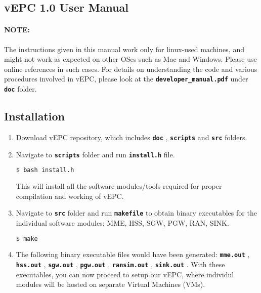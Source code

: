 \documentclass[hidelinks]{report}
\newcommand{\cf}[1] {
	\textbf{\texttt{#1}}
}
\begin{document}

\begin{center}
\section*{vEPC 1.0 User Manual}
\end{center}

\paragraph*{NOTE:}

The instructions given in this manual work only for linux-used machines, and might not work as expected on other OSes such as Mac and Windows. Please use online references in such cases. For details on understanding the code and various procedures involved in vEPC, please look at the \cf{developer\_manual.pdf} under \cf{doc} folder.

\subsection*{Installation}

\begin{enumerate}

\item Download vEPC repository, which includes \cf{doc}, \cf{scripts} and \cf{src} folders.

\item Navigate to \cf{scripts} folder and run \cf{install.h} file.

\begin{lstlisting}[language=bash]
$ bash install.h
\end{lstlisting}

This will install all the software modules/tools required for proper compilation and working of vEPC.

\item Navigate to \cf{src} folder and run \cf{makefile} to obtain binary executables for the individual software modules: MME, HSS, SGW, PGW, RAN, SINK.

\begin{lstlisting}[language=bash]
$ make
\end{lstlisting}

\item The following binary executable files would have been generated: \cf{mme.out}, \cf{hss.out}, \cf{sgw.out}, \cf{pgw.out}, \cf{ransim.out}, \cf{sink.out}. With these executables, you can now proceed to setup our vEPC, where individul modules will be hosted on separate Virtual Machines (VMs).

\end{enumerate}
\end{document}
